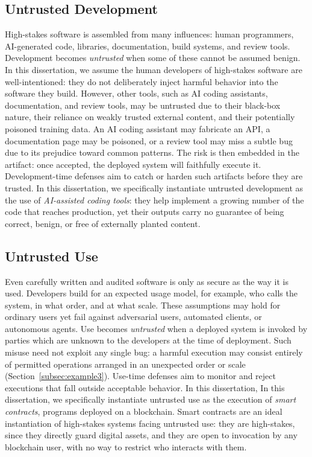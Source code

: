 \subsection{Untrusted Development}

High-stakes software is assembled from many influences: 
human
programmers, AI-generated code, libraries, documentation, 
build systems, and
review tools. Development becomes \emph{untrusted} when 
some of these cannot be
assumed benign. 
In this dissertation, we assume the human developers of high-stakes software
are well-intentioned: they do not deliberately inject harmful behavior
into the software they build. 
However, other tools, such as AI coding assistants, 
documentation, and review tools, may be untrusted
due to their black-box nature, 
their reliance on weakly trusted external content, 
and their potentially poisoned training data. 
An AI coding assistant may fabricate an API, a
documentation page may be poisoned, 
or a review tool may miss a subtle bug due 
to its prejudice toward common patterns.
The risk is then embedded in the artifact: once accepted, the deployed system will
faithfully execute it. 
Development-time defenses aim to catch or harden such
artifacts before they are trusted. In this dissertation, we
specifically instantiate
untrusted development as the use of \emph{AI-assisted coding
tools}: they
help implement a growing number of the code that reaches production, yet their
outputs carry no guarantee of being correct, benign, or free of
externally planted content.

\subsection{Untrusted Use}
\label{subsec:untrusted-use}

Even carefully written and audited software is only as secure as the way
it is used. Developers build for an expected usage model, for example,
who calls the system,
in what order, and at what scale. These 
assumptions may hold for ordinary users
yet fail against adversarial users, 
automated clients, or autonomous agents. 
Use becomes \emph{untrusted} when 
a deployed system is invoked by parties 
which are unknown to the developers at the 
time of deployment. 
Such misuse need not exploit any single bug: a harmful execution may
consist entirely of permitted operations arranged in an unexpected order or
scale (Section~\ref{subsec:example3}). Use-time defenses
aim to monitor and reject executions that fall outside acceptable behavior.
In this dissertation, In this dissertation, we
specifically instantiate untrusted use as the
execution of \emph{smart contracts}, programs deployed on a blockchain.
Smart contracts are an ideal instantiation of high-stakes systems facing 
untrusted use: they are high-stakes, since
they directly guard digital assets, and they are open to invocation by
any blockchain user, with no way to restrict who interacts with them.



